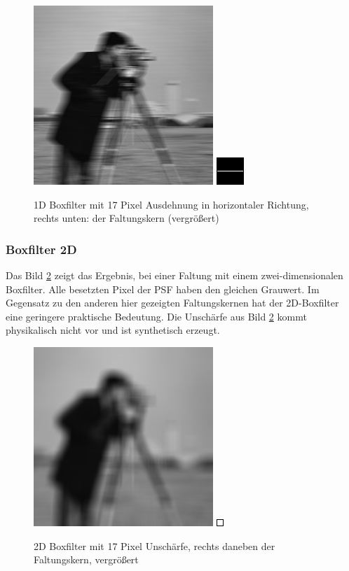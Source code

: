 \documentclass[a4paper,12pt]{article}
\begin{document}
\begin{figure}[htbp]
\centering
\includegraphics[scale=0.8]{move17.png}
\includegraphics[scale=2.1]{kern1D37px.png}
\caption{1D Boxfilter mit 17 Pixel Ausdehnung in horizontaler Richtung, rechts
unten: der Faltungskern (vergrößert)}
\label{figure_motion}
\end{figure}



\subsubsection{Boxfilter 2D}
Das Bild \ref{figure_motion2d} zeigt das Ergebnis, bei einer Faltung mit einem
zwei-dimensionalen Boxfilter. Alle besetzten Pixel der PSF haben den gleichen
Grauwert.
Im Gegensatz zu den anderen hier gezeigten Faltungskernen hat der
2D-Boxfilter eine geringere praktische Bedeutung. Die Unschärfe aus Bild
\ref{figure_motion2d} kommt physikalisch nicht vor und ist synthetisch erzeugt.


\begin{figure}[htbp]
\centering
\includegraphics[scale=0.8]{box17.png}
\includegraphics[scale=7]{kern2D9mal9.png}
\caption{2D Boxfilter mit 17 Pixel Unschärfe, rechts daneben der Faltungskern,
vergrößert}
\label{figure_motion2d}
\end{figure}
\end{document}
